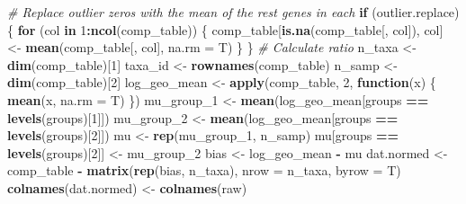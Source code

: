 \documentclass[
]{book}
\newenvironment{Shaded}{\begin{snugshade}}{\end{snugshade}}
\newcommand{\CommentTok}[1]{\textcolor[rgb]{0.56,0.35,0.01}{\textit{#1}}}
\newcommand{\ControlFlowTok}[1]{\textcolor[rgb]{0.13,0.29,0.53}{\textbf{#1}}}
\newcommand{\DataTypeTok}[1]{\textcolor[rgb]{0.13,0.29,0.53}{#1}}
\newcommand{\DecValTok}[1]{\textcolor[rgb]{0.00,0.00,0.81}{#1}}
\newcommand{\KeywordTok}[1]{\textcolor[rgb]{0.13,0.29,0.53}{\textbf{#1}}}
\newcommand{\NormalTok}[1]{#1}
\newcommand{\OperatorTok}[1]{\textcolor[rgb]{0.81,0.36,0.00}{\textbf{#1}}}
\newcommand{\StringTok}[1]{\textcolor[rgb]{0.31,0.60,0.02}{#1}}
\begin{document}
\begin{Shaded}
\begin{Highlighting}[]
    \CommentTok{\# Replace outlier zeros with the mean of the rest genes in each}
    \ControlFlowTok{if}\NormalTok{ (outlier.replace) \{}
        \ControlFlowTok{for}\NormalTok{ (col }\ControlFlowTok{in} \DecValTok{1}\OperatorTok{:}\KeywordTok{ncol}\NormalTok{(comp\_table)) \{}
\NormalTok{            comp\_table[}\KeywordTok{is.na}\NormalTok{(comp\_table[, col]), col] \textless{}{-}}
\StringTok{                }\KeywordTok{mean}\NormalTok{(comp\_table[, col], }\DataTypeTok{na.rm =}\NormalTok{ T)}
\NormalTok{        \}}
\NormalTok{    \}}
    \CommentTok{\# Calculate ratio}
\NormalTok{    n\_taxa \textless{}{-}}\StringTok{ }\KeywordTok{dim}\NormalTok{(comp\_table)[}\DecValTok{1}\NormalTok{]}
\NormalTok{    taxa\_id \textless{}{-}}\StringTok{ }\KeywordTok{rownames}\NormalTok{(comp\_table)}
\NormalTok{    n\_samp \textless{}{-}}\StringTok{ }\KeywordTok{dim}\NormalTok{(comp\_table)[}\DecValTok{2}\NormalTok{]}
\NormalTok{    log\_geo\_mean \textless{}{-}}
\StringTok{        }\KeywordTok{apply}\NormalTok{(comp\_table, }\DecValTok{2}\NormalTok{, }\ControlFlowTok{function}\NormalTok{(x) \{}
            \KeywordTok{mean}\NormalTok{(x, }\DataTypeTok{na.rm =}\NormalTok{ T)}
\NormalTok{        \})}
\NormalTok{    mu\_group\_}\DecValTok{1}\NormalTok{ \textless{}{-}}\StringTok{ }\KeywordTok{mean}\NormalTok{(log\_geo\_mean[groups }\OperatorTok{==}\StringTok{ }\KeywordTok{levels}\NormalTok{(groups)[}\DecValTok{1}\NormalTok{]])}
\NormalTok{    mu\_group\_}\DecValTok{2}\NormalTok{ \textless{}{-}}\StringTok{ }\KeywordTok{mean}\NormalTok{(log\_geo\_mean[groups }\OperatorTok{==}\StringTok{ }\KeywordTok{levels}\NormalTok{(groups)[}\DecValTok{2}\NormalTok{]])}
\NormalTok{    mu \textless{}{-}}\StringTok{ }\KeywordTok{rep}\NormalTok{(mu\_group\_}\DecValTok{1}\NormalTok{, n\_samp)}
\NormalTok{    mu[groups }\OperatorTok{==}\StringTok{ }\KeywordTok{levels}\NormalTok{(groups)[}\DecValTok{2}\NormalTok{]] \textless{}{-}}\StringTok{ }\NormalTok{mu\_group\_}\DecValTok{2}
\NormalTok{    bias \textless{}{-}}\StringTok{ }\NormalTok{log\_geo\_mean }\OperatorTok{{-}}\StringTok{ }\NormalTok{mu}
\NormalTok{    dat.normed \textless{}{-}}
\StringTok{        }\NormalTok{comp\_table }\OperatorTok{{-}}\StringTok{ }\KeywordTok{matrix}\NormalTok{(}\KeywordTok{rep}\NormalTok{(bias, n\_taxa), }\DataTypeTok{nrow =}\NormalTok{ n\_taxa, }\DataTypeTok{byrow =}\NormalTok{ T)}
    \KeywordTok{colnames}\NormalTok{(dat.normed) \textless{}{-}}\StringTok{ }\KeywordTok{colnames}\NormalTok{(raw)}
    

\end{Highlighting}
\end{Shaded}
\end{document}
